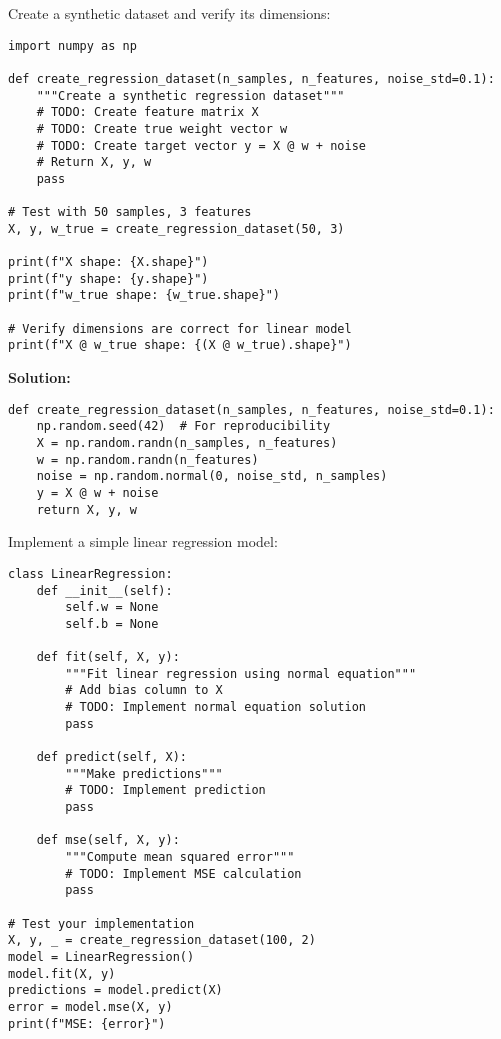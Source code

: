 \documentclass{article}
\newcounter{coding}
\begin{document}
\begin{tcolorbox}[colback=cyan!5!white,colframe=cyan!75!black,title=Coding Problem \stepcounter{coding}\#\thecoding: Dataset Creation]
Create a synthetic dataset and verify its dimensions:

\begin{verbatim}
import numpy as np

def create_regression_dataset(n_samples, n_features, noise_std=0.1):
    """Create a synthetic regression dataset"""
    # TODO: Create feature matrix X
    # TODO: Create true weight vector w
    # TODO: Create target vector y = X @ w + noise
    # Return X, y, w
    pass

# Test with 50 samples, 3 features
X, y, w_true = create_regression_dataset(50, 3)

print(f"X shape: {X.shape}")
print(f"y shape: {y.shape}")  
print(f"w_true shape: {w_true.shape}")

# Verify dimensions are correct for linear model
print(f"X @ w_true shape: {(X @ w_true).shape}")
\end{verbatim}

\textbf{Solution:}
\begin{verbatim}
def create_regression_dataset(n_samples, n_features, noise_std=0.1):
    np.random.seed(42)  # For reproducibility
    X = np.random.randn(n_samples, n_features)
    w = np.random.randn(n_features)
    noise = np.random.normal(0, noise_std, n_samples)
    y = X @ w + noise
    return X, y, w
\end{verbatim}
\end{tcolorbox}

\begin{tcolorbox}[colback=cyan!5!white,colframe=cyan!75!black,title=Coding Problem \stepcounter{coding}\#\thecoding: Linear Model Implementation]
Implement a simple linear regression model:

\begin{verbatim}
class LinearRegression:
    def __init__(self):
        self.w = None
        self.b = None
    
    def fit(self, X, y):
        """Fit linear regression using normal equation"""
        # Add bias column to X
        # TODO: Implement normal equation solution
        pass
    
    def predict(self, X):
        """Make predictions"""
        # TODO: Implement prediction
        pass
    
    def mse(self, X, y):
        """Compute mean squared error"""
        # TODO: Implement MSE calculation
        pass

# Test your implementation
X, y, _ = create_regression_dataset(100, 2)
model = LinearRegression()
model.fit(X, y)
predictions = model.predict(X)
error = model.mse(X, y)
print(f"MSE: {error}")
\end{verbatim}
\end{tcolorbox}
\end{document}
